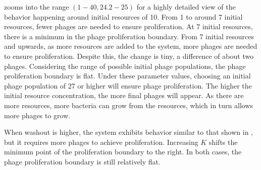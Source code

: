  zooms into the range $(1-40, 24.2-25)$ for a highly detailed view of the behavior happening around initial resources of 10. 
From 1 to around 7 initial resources, fewer phages are needed to ensure proliferation. 
At 7 initial resources, there is a minimum in the phage proliferation boundary. 
From 7 initial resources and upwards, as more resources are added to the system, more phages are needed to ensure proliferation. 
Despite this, the change is tiny, a difference of about two phages. 
Considering the range of possible initial phage populations, the phage proliferation boundary is flat. 
Under these parameter values, choosing an initial phage population of 27 or higher will ensure phage proliferation. 
The higher the initial resource concentration, the more final phages will appear. 
As there are more resources, more bacteria can grow from the resources, which in turn allows more phages to grow. 

When washout is higher, the system exhibits behavior similar to that shown in , but it requires more phages to achieve proliferation. 
Increasing $K$ shifts the minimum point of the proliferation boundary to the right.
In both cases, the phage proliferation boundary is still relatively flat.  

